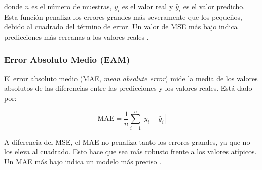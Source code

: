 donde \(n\) es el número de muestras, \(y_i\) es el valor real y \(\hat{y}_i\) es el valor predicho. Esta función penaliza los errores grandes más severamente que los pequeños, debido al cuadrado del término de error. Un valor de MSE más bajo indica predicciones más cercanas a los valores reales \cite{pajares2021aprendizaje}.

\subsubsection{Error Absoluto Medio (EAM)}

El error absoluto medio (MAE, \textit{mean absolute error}) mide la media de los valores absolutos de las diferencias entre las predicciones y los valores reales. Está dado por:

\begin{equation}
    \text{MAE} = \frac{1}{n} \sum_{i=1}^{n} |y_i - \hat{y}_i|
\end{equation}

A diferencia del MSE, el MAE no penaliza tanto los errores grandes, ya que no los eleva al cuadrado. Esto hace que sea más robusto frente a los valores atípicos. Un MAE más bajo indica un modelo más preciso \cite{pajares2021aprendizaje}.

